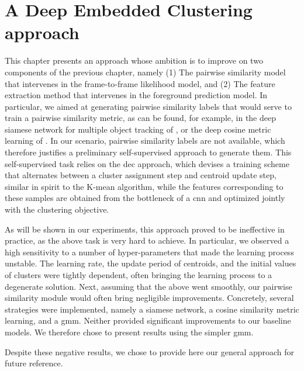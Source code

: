
\chapter{A Deep Embedded Clustering approach}
This chapter presents an approach whose ambition is to improve on two components of the previous chapter, namely
(1) The pairwise similarity model that intervenes in the frame-to-frame likelihood model, and
(2) The feature extraction method that intervenes in the foreground prediction model.
In particular, we aimed at generating pairwise similarity labels that would serve to train a pairwise similarity metric, as can be found, for example, in the deep siamese network for multiple object tracking of \cite{cuan18}, or the deep cosine metric learning of \cite{wojke18}.
In our scenario, pairwise similarity labels are not available, which therefore justifies a preliminary self-supervised approach to generate them.
This self-supervised task relies on the \gls{dec} approach, which devises a training scheme that
alternates between a cluster assignment step and centroid update step, similar in spirit to the K-mean algorithm, while the features corresponding to these samples are obtained from the bottleneck of a \gls{cnn} and optimized jointly with the clustering objective.

As will be shown in our experiments, this approach proved to be ineffective in practice, as the above task is very hard to achieve.
In particular, we observed a high sensitivity to a number of hyper-parameters that made the learning process unstable.
The learning rate, the update period of centroids, and the initial values of clusters were tightly dependent, often bringing the learning process to a degenerate solution.
Next, assuming that the above went smoothly, our pairwise similarity module would often bring negligible improvements.
Concretely, several strategies were implemented, namely a siamese network, a cosine similarity metric learning, and a \gls{gmm}.
Neither provided significant improvements to our baseline models.
We therefore chose to present results using the simpler \gls{gmm}.

Despite these negative results, we chose to provide here our general approach for future reference.






